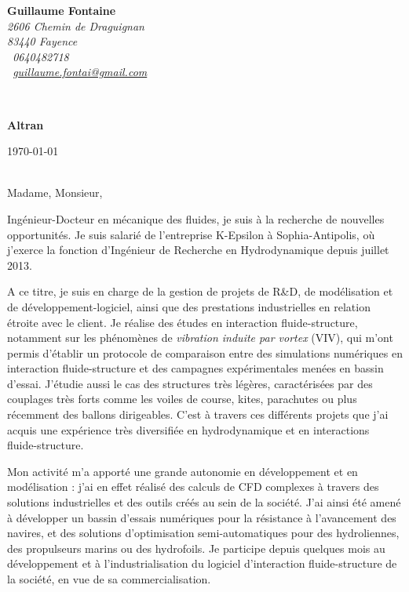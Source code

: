\documentclass[11pt]{article}
\begin{document}
\sffamily   %
\hfill%
\begin{minipage}[t]{.6\textwidth}
\raggedleft%
{\bfseries Guillaume Fontaine}\\[.35ex]
\small\itshape%
2606 Chemin de Draguignan\\
83440 Fayence\\[.35ex]
\Telefon~0640482718\\
\Letter~\href{mailto:guillaume.fontai@gmail.com}{guillaume.fontai@gmail.com}
\end{minipage}\\[1em]
%
\begin{minipage}[t]{.4\textwidth}
\raggedright%
{\bfseries Altran}\\[.35ex]
\end{minipage}
\hfill %
\begin{minipage}[t]{.4\textwidth}
\raggedleft %
\today
\end{minipage}\\[2em]
Madame, Monsieur,

Ingénieur-Docteur en mécanique des fluides, je suis à la recherche de nouvelles opportunités. Je suis salarié de l'entreprise K-Epsilon à Sophia-Antipolis, où j'exerce la fonction d'Ingénieur de Recherche en Hydrodynamique depuis juillet 2013.

A ce titre, je suis en charge de la gestion de projets de R\&D, de modélisation et de développement-logiciel, ainsi que des prestations industrielles en relation étroite avec le client. Je réalise des études en interaction fluide-structure, notamment sur les phénomènes de \textit{vibration induite par vortex} (VIV), qui m'ont permis d'établir un protocole de comparaison entre des simulations numériques en interaction fluide-structure et des campagnes expérimentales menées en bassin d'essai. J'étudie aussi le cas des structures très légères, caractérisées par des couplages très forts comme les voiles de course, kites, parachutes ou plus récemment des ballons dirigeables. C'est à travers ces différents projets que j'ai acquis une expérience très diversifiée en hydrodynamique et en interactions fluide-structure.

Mon activité m'a apporté une grande autonomie en développement et en modélisation : j'ai en effet réalisé des calculs de CFD complexes à travers des solutions industrielles et des outils créés au sein de la société. J'ai ainsi été amené à développer un bassin d'essais numériques pour la résistance à l'avancement des navires, et des solutions d'optimisation semi-automatiques pour des hydroliennes, des propulseurs marins ou des hydrofoils. Je participe depuis quelques mois au développement et à l'industrialisation du logiciel d'interaction fluide-structure de la société, en vue de sa commercialisation.
\end{document}
